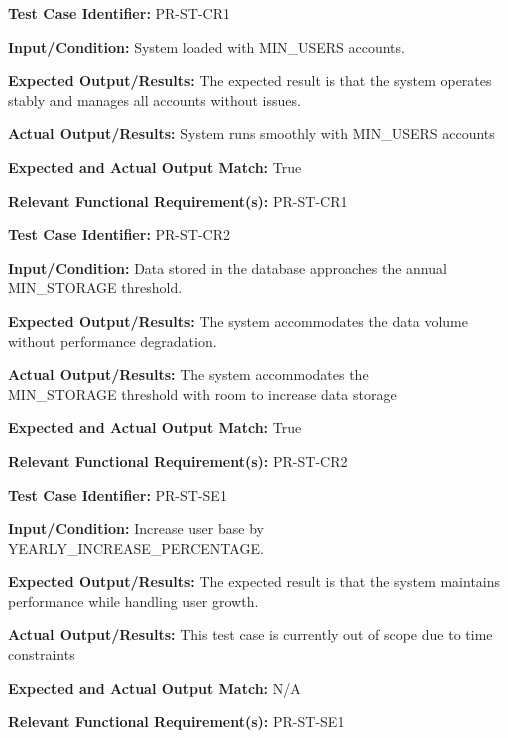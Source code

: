 \documentclass[12pt, titlepage]{article}
\begin{document}
\begin{mdframed}[linewidth=0.5mm]
  \textbf{Test Case Identifier:} PR-ST-CR1 \par
  \textbf{Input/Condition:} System loaded with MIN\_USERS accounts. \par
  \textbf{Expected Output/Results:} The expected result is that the system operates stably and manages all accounts without issues. \par
  \textbf{Actual Output/Results:} System runs smoothly with MIN\_USERS accounts\par
  \textbf{Expected and Actual Output Match:} True \par
  \textbf{Relevant Functional Requirement(s):} PR-ST-CR1
\end{mdframed}

\begin{mdframed}[linewidth=0.5mm]
  \textbf{Test Case Identifier:} PR-ST-CR2 \par
  \textbf{Input/Condition:} Data stored in the database approaches the annual \\MIN\_STORAGE threshold. \par
  \textbf{Expected Output/Results:} The system accommodates the data volume without performance degradation. \par
  \textbf{Actual Output/Results:} The system accommodates the \\MIN\_STORAGE threshold with room to increase data storage\par
  \textbf{Expected and Actual Output Match:} True \par
  \textbf{Relevant Functional Requirement(s):} PR-ST-CR2
\end{mdframed}

\begin{mdframed}[linewidth=0.5mm]
  \textbf{Test Case Identifier:} PR-ST-SE1 \par
  \textbf{Input/Condition:} Increase user base by \\YEARLY\_INCREASE\_PERCENTAGE. \par
  \textbf{Expected Output/Results:} The expected result is that the system maintains performance while handling user growth. \par
  \textbf{Actual Output/Results:} This test case is currently out of scope due to time constraints\par
  \textbf{Expected and Actual Output Match:} N/A \par
  \textbf{Relevant Functional Requirement(s):} PR-ST-SE1
\end{mdframed}
\end{document}
